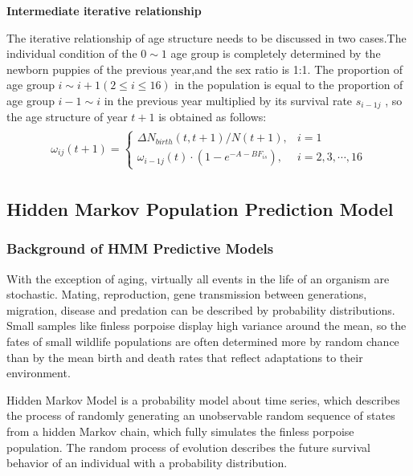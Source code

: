 \documentclass[12pt]{article}  %
\begin{document}
\noindent%
\Rightarrow 
\textbf{Intermediate iterative relationship}

The iterative relationship of age structure needs to be discussed in two cases.The individual condition of the $0\sim 1$ age group is completely determined by the newborn puppies of the previous year,and the sex ratio is 1:1.
The proportion of age group $i\sim i+1(2\le i\le 16)$ in the population is equal to the proportion of age group $i-1\sim i$ in the previous year multiplied by its survival rate ${{s}_{i-1j}}$ , so the age structure of year $t+1$ is obtained as follows:
\begin{equation}
\begin{align*}
\begin{split}
{{\omega }_{ij}}(t+1)= \left \{
\begin{array}{ll}
{\Delta {{N}_{birth}}(t,t+1)}/{N(t+1)},   & i=1\\
{{\omega }_{i-1j}}(t)\cdot (1-{{e}^{-A-B{{F}_{is}}}}),     & i=2,3,\cdots ,16
\end{array}
\right.
\end{split}
\end{align*}
\end{equation}

\subsection{Hidden Markov Population Prediction Model}
\subsubsection{Background of HMM Predictive Models}
With the exception of aging, virtually all events in the life of an organism are stochastic. Mating, reproduction, gene transmission between generations, migration, disease and predation can be described by probability distributions. Small samples like finless porpoise display high variance around the mean, so the fates of small wildlife populations are often determined more by random chance than by the mean birth and death rates that reflect adaptations to their environment.

Hidden Markov Model is a probability model about time series, which describes the process of randomly generating an unobservable random sequence of states from a hidden Markov chain, which fully simulates the finless porpoise population. The random process of evolution describes the future survival behavior of an individual with a probability distribution.
\end{document}
